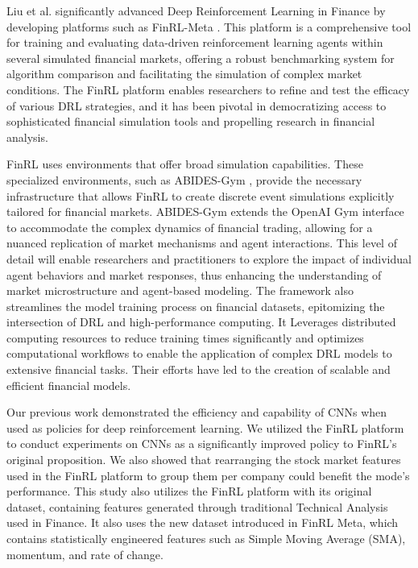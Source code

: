 Liu et al. significantly advanced Deep Reinforcement Learning in Finance by developing platforms such as FinRL-Meta \cite{Liu2022FinRL}. This platform is a comprehensive tool for training and evaluating data-driven reinforcement learning agents within several simulated financial markets, offering a robust benchmarking system for algorithm comparison and facilitating the simulation of complex market conditions. The FinRL platform enables researchers to refine and test the efficacy of various DRL strategies, and it has been pivotal in democratizing access to sophisticated financial simulation tools and propelling research in financial analysis.

FinRL uses environments that offer broad simulation capabilities. These specialized environments, such as ABIDES-Gym \cite{Vyawahare2020}, provide the necessary infrastructure that allows FinRL to create discrete event simulations explicitly tailored for financial markets. ABIDES-Gym extends the OpenAI Gym interface to accommodate the complex dynamics of financial trading, allowing for a nuanced replication of market mechanisms and agent interactions. This level of detail will enable researchers and practitioners to explore the impact of individual agent behaviors and market responses, thus enhancing the understanding of market microstructure and agent-based modeling. The framework also streamlines the model training process on financial datasets, epitomizing the intersection of DRL and high-performance computing. It Leverages distributed computing resources to reduce training times significantly and optimizes computational workflows to enable the application of complex DRL models to extensive financial tasks. Their efforts have led to the creation of scalable and efficient financial models.

Our previous work \cite{Montazeri2023} demonstrated the efficiency and capability of CNNs when used as policies for deep reinforcement learning. We utilized the FinRL platform to conduct experiments on CNNs as a significantly improved policy to FinRL's original proposition. We also showed \cite{Montazeri2024, Montazeri2024GradientRC} that rearranging the stock market features used in the FinRL platform to group them per company could benefit the mode's performance. This study also utilizes the FinRL platform with its original dataset, containing features generated through traditional Technical Analysis used in Finance. It also uses the new dataset introduced in FinRL Meta, which contains statistically engineered features such as Simple Moving Average (SMA), momentum, and rate of change.

